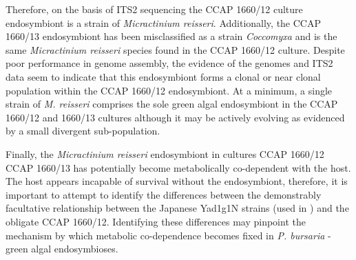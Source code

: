 Therefore, on the basis of ITS2 sequencing the CCAP 1660/12 culture endosymbiont is
a strain of \textit{Micractinium reisseri}.  Additionally, the CCAP 1660/13
endosymbiont has been misclassified as a strain \textit{Coccomyxa} and
is the same \textit{Micractinium reisseri} species found in the CCAP 1660/12 
culture. Despite poor performance in genome assembly, the evidence of
the genomes and ITS2 data seem to indicate that this endosymbiont
forms a clonal or near clonal population within the CCAP 1660/12
endosymbiont.  At a minimum, a single strain of \textit{M. reisseri} 
comprises the sole green algal endosymbiont in the CCAP 1660/12
and 1660/13 cultures although it may be actively evolving as evidenced
by a small divergent sub-population. 

Finally, the \textit{Micractinium reisseri} endosymbiont in cultures CCAP 1660/12 
CCAP 1660/13 has potentially become metabolically co-dependent with the host.
The host appears incapable of survival without the endosymbiont, therefore,
it is important to attempt to identify the differences between the demonstrably
facultative relationship between the Japanese Yad1g1N strains (used in \citep{Kodama2014c}) 
and the obligate CCAP 1660/12. Identifying these differences may pinpoint
the mechanism by which metabolic co-dependence becomes fixed in \textit{P. bursaria}
- green algal endosymbioses.
